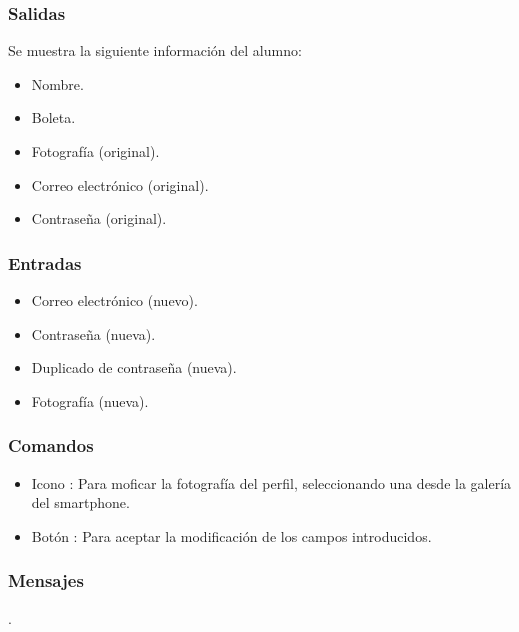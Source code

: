 \pagebreak
{}

\subsubsection{Salidas}
	Se muestra la siguiente información del alumno:
	\begin{itemize}
		\item Nombre.
		\item Boleta.
		\item Fotografía (original).
		\item Correo electrónico (original).
		\item Contraseña (original).
	\end{itemize}

\subsubsection{Entradas}
	\begin{itemize}
		\item Correo electrónico (nuevo).
		\item Contraseña (nueva).
		\item Duplicado de contraseña (nueva). 
		\item Fotografía (nueva). 
	\end{itemize}

\subsubsection{Comandos}	
	\begin{itemize}
		\item Icono : Para moficar la fotografía del perfil,
		seleccionando una desde la galería del smartphone.
		\item Botón : Para aceptar la modificación de los
		campos introducidos.
	\end{itemize}

\subsubsection{Mensajes}
	\noindent
	.



\pagebreak





					
